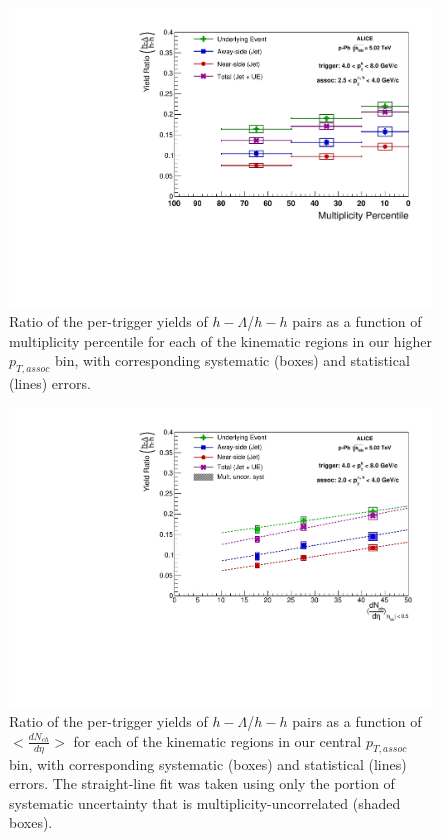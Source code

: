\documentclass[ALICE,manyauthors]{ALICE_analysis_notes}
\begin{document}
\clearpage

\begin{figure}[ht]
\centering
\includegraphics[width=6in]{figures/ratio_plot_highpt.pdf}
\caption{Ratio of the per-trigger yields of $h-\Lambda$/$h-h$ pairs as a function of multiplicity percentile for each of the kinematic regions in our higher $p_{T, assoc}$ bin, with corresponding systematic (boxes) and statistical (lines) errors. }
\label{ratioplot_highpt}
\end{figure}

\clearpage 

\begin{figure}[ht]
\centering
\includegraphics[width=6in]{figures/ratio_plot_new_x_axis_with_fits.pdf}
\caption{Ratio of the per-trigger yields of $h-\Lambda$/$h-h$ pairs as a function of $<\frac{dN_{ch}}{d\eta}>$ for each of the kinematic regions in our central $p_{T, assoc}$ bin, with corresponding systematic (boxes) and statistical (lines) errors. The straight-line fit was taken using only the portion of systematic uncertainty that is multiplicity-uncorrelated (shaded boxes).}
\label{final_ratios_dndeta}
\end{figure}
\end{document}

